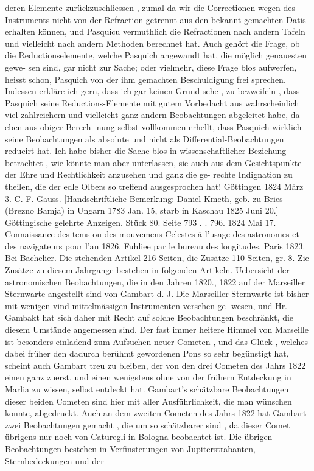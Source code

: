 \documentclass[12pt,a4paper]{article}
\begin{document}
{{{{{{{{deren  Elemente  zurückzuschliessen ,  zumal  da  wir  die  Correctionen  wegen  des  Instruments  nicht  von  der Refraction  getrennt  aus  den  bekannt  gemachten  Datis  erhalten  können,  und  Pasquicu  vermuthlich  die Refractionen  nach  andern  Tafeln  und  vielleicht  nach  andern  Methoden  berechnet  hat.  Auch  gehört die  Frage,  ob  die  Reductionselemente,  welche  Pasquich  angewandt  hat,  die  möglich  genauesten  gewe- sen sind,  gar  nicht  zur  Sache;  oder  vielmehr,  diese  Frage  blos  aufwerfen,  heisst  schon,  Pasquich  von der  ihm  gemachten  Beschuldigung  frei  sprechen.  Indessen  erkläre  ich  gern,  dass  ich  gar  keinen  Grund sehe ,  zu  bezweifeln ,  dass  Pasquich  seine  Reductions-Elemente  mit  gutem  Vorbedacht  aus  wahrscheinlich viel  zahlreichern  und  vielleicht  ganz  andern  Beobachtungen  abgeleitet  habe,  da  eben  aus  obiger  Berech- nung selbst  vollkommen  erhellt,  dass  Pasquich  wirklich  seine  Beobachtungen  als  absolute  und  nicht als  Differential-Beobachtungen  reducirt  hat. Ich  habe  bisher  die  Sache  blos  in  wissenschaftlicher  Beziehung  betrachtet ,  wie  könnte  man  aber unterlassen,  sie  auch  aus  dem  Gesichtspunkte  der  Ehre  und  Rechtlichkeit  anzusehen  und  ganz  die  ge- rechte Indignation  zu  theilen,  die  der  edle  Olbers  so  treffend  ausgesprochen  hat! Göttingen  1824  März  3.  C.  F.  Gauss. [Handschriftliche  Bemerkung:  Daniel  Kmeth,  geb.  zu  Bries  (Brezno  Bamja)  in  Ungarn  1783  Jan.  15, starb  in  Kaschau  1825  Juni  20.] Göttingische  gelehrte  Anzeigen.    Stück  80.     Seite  793  . .  796.     1824  Mai  17. Connaissance  des  tems  ou  des  mouvemens  Celestes  ä  l'usage  des  astronomes  et  des  navigateurs  pour l'an  1826.  Fuhliee  par  le  bureau  des  longitudes.  Paris  1823.  Bei  Bachelier.  Die  stehenden  Artikel  216 Seiten,  die  Zusätze  110  Seiten,     gr.  8. Zie  Zusätze  zu  diesem  Jahrgange  bestehen  in  folgenden  Artikeln.  Uebersicht  der  astronomischen Beobachtungen,  die  in  den  Jahren  1820.,  1822  auf  der  Marseiller  Sternwarte  angestellt  sind  von  Gambart d.  J.  Die  Marseiller  Sternwarte  ist  bisher  mit  wenigen  vind  mittelmässigen  Instrumenten  versehen  ge- wesen, und  Hr.  Gambakt  hat  sich  daher  mit  Recht  auf  solche  Beobachtungen  beschränkt,  die  diesem Umstände  angemessen  sind.  Der  fast  immer  heitere  Himmel  von  Marseille  ist  besonders  einladend  zum Aufsuchen  neuer  Cometen ,  und  das  Glück ,  welches  dabei  früher  den  dadurch  berühmt  gewordenen  Pons so  sehr  begünstigt  hat,  scheint  auch  Gambart  treu  zu  bleiben,  der  von  den  drei  Cometen  des  Jahrs 1822  einen  ganz  zuerst,  und  einen  wenigstens  ohne  von  der  frühern  Entdeckung  in  Marlia  zu  wissen, selbst  entdeckt  hat.  Gambart's  schätzbare  Beobachtungen  dieser  beiden  Cometen  sind  hier  mit  aller Ausführlichkeit,  die  man  wünschen  konnte,  abgedruckt.  Auch  an  dem  zweiten  Cometen  des  Jahrs  1822 hat  Gambart  zwei  Beobachtungen  gemacht ,  die  um  so  schätzbarer  sind ,  da  dieser  Comet  übrigens  nur noch  von  Caturegli  in  Bologna  beobachtet  ist.  Die  übrigen  Beobachtungen  bestehen  in  Verfinsterungen von  Jupiterstrabanten,  Sternbedeckungen  und  der  }}}}}}}}
\end{document}
